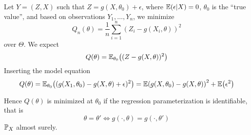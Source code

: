 \begin{exmp}
  \label{defn:parametric_statistical_models:4}
  Let $Y = (Z, X)$ such that $Z = g(X, \theta_{0}) + \epsilon$, where
  $\E{\epsilon | X} = 0$, $\theta_{0}$ is the ``true value'', and
  based on \iid observations $Y_{1}, \dots, Y_{n}$, we minimize
  \begin{equation}
    \label{eq:38}
    Q_{n}(\theta)= \frac{1}{n} \sum_{i=1}^{n} (Z_{i} - g(X_{i}, \theta))^{2}
  \end{equation} over $\Theta$.  We expect
  \begin{equation}
    \label{eq:40}
    Q(\theta) = \E{(Z - g(X, \theta))^{2}}{\theta_{0}}
  \end{equation}  Inserting the model equation
  \begin{equation}
    \label{eq:41}
    Q(\theta) = \E{(g(X_{1}, \theta_{0}) - g(X,
    \theta) + \epsilon)^{2}}{\theta_{0}} = \E{g(X, \theta_{0}) - g(X, \theta)}^{2}
    + \E{\epsilon^{2}}
  \end{equation}

  Hence $Q(\theta)$ is minimized at $\theta_{0}$ if the regression
  parameterization is identifiable, that is
  \begin{equation}
    \label{eq:42}
    \theta = \theta' \iff g(\cdot, \theta) = g(\cdot, \theta')
  \end{equation} ${\Prob}_{X}$ almost surely.
\end{exmp}

